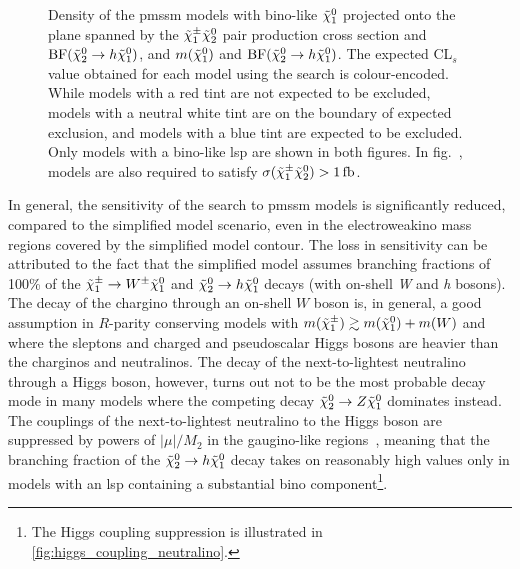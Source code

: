 \begin{figure}
	\caption{Density of the \gls{pmssm} models with bino-like $\tilde{\chi}_1^0$ projected onto the plane spanned by  the $\tilde{\chi}_1^\pm\tilde{\chi}_2^0$ pair production cross section and $\mathrm{BF}(\tilde{\chi}_2^0 \rightarrow h \tilde{\chi}_1^0)$, and  $m(\tilde{\chi}_1^0)$ and $\mathrm{BF}(\tilde{\chi}_2^0 \rightarrow h \tilde{\chi}_1^0)$. The expected CL$_s$ value obtained for each model using the \onelepton search is colour-encoded. While models with a red tint are not expected to be excluded, models with a neutral white tint are on the boundary of expected exclusion, and models with a blue tint are expected to be excluded. Only models with a bino-like \gls{lsp} are shown in both figures. In fig.~, models are also required to satisfy $\sigma(\charg\neutr)>\SI{1}{\femto\barn}$.}
	\label{fig:bino_sensitivity}
\end{figure}

In general, the sensitivity of the \onelepton search to \gls{pmssm} models is significantly reduced, compared to the simplified model scenario, even in the electroweakino mass regions covered by the simplified model contour. The loss in sensitivity can be attributed to the fact that the simplified model assumes branching fractions of 100\% of the $\tilde{\chi}_1^\pm \rightarrow W^\pm \tilde{\chi}_1^0$ and $\tilde{\chi}_2^0 \rightarrow h \tilde{\chi}_1^0$ decays (with on-shell \textit{W} and \textit{h} bosons).
The decay of the chargino through an on-shell $W$ boson is, in general, a good assumption in $R$-parity conserving models with $m(\tilde{\chi}_1^\pm) \gtrsim m(\tilde{\chi}_1^0)+m(W)$ and where the sleptons and charged and pseudoscalar Higgs bosons are heavier than the charginos and neutralinos. The decay of the next-to-lightest neutralino through a Higgs boson, however, turns out not to be the most probable decay mode in many models where the competing decay $\tilde{\chi}_2^0 \rightarrow Z \tilde{\chi}_1^0$ dominates instead.
The couplings of the next-to-lightest neutralino to the Higgs boson are suppressed by powers of $\vert\mu\vert/M_2$ in the gaugino-like regions~\cite{Arbey:2012fa}, meaning that the branching fraction of the $\tilde{\chi}_2^0 \rightarrow h \tilde{\chi}_1^0$ decay takes on reasonably high values only in models with an \gls{lsp} containing a substantial bino component\footnote{The Higgs coupling suppression is illustrated in \cref{fig:higgs_coupling_neutralino}.}.

